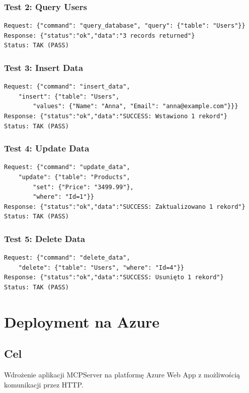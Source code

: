 \documentclass[twoside]{article}
\begin{document}
\subsubsection{Test 2: Query Users}
\begin{verbatim}
Request: {"command": "query_database", "query": {"table": "Users"}}
Response: {"status":"ok","data":"3 records returned"}
Status: TAK (PASS)
\end{verbatim}

\subsubsection{Test 3: Insert Data}
\begin{verbatim}
Request: {"command": "insert_data", 
	"insert": {"table": "Users", 
		"values": {"Name": "Anna", "Email": "anna@example.com"}}}
Response: {"status":"ok","data":"SUCCESS: Wstawiono 1 rekord"}
Status: TAK (PASS)
\end{verbatim}

\subsubsection{Test 4: Update Data}
\begin{verbatim}
Request: {"command": "update_data",
	"update": {"table": "Products", 
		"set": {"Price": "3499.99"}, 
		"where": "Id=1"}}
Response: {"status":"ok","data":"SUCCESS: Zaktualizowano 1 rekord"}
Status: TAK (PASS)
\end{verbatim}

\subsubsection{Test 5: Delete Data}
\begin{verbatim}
Request: {"command": "delete_data",
	"delete": {"table": "Users", "where": "Id=4"}}
Response: {"status":"ok","data":"SUCCESS: Usunięto 1 rekord"}
Status: TAK (PASS)
\end{verbatim}

\section{Deployment na Azure}

\subsection{Cel}
Wdrożenie aplikacji MCPServer na platformę Azure Web App z możliwością komunikacji przez HTTP.
\end{document}
